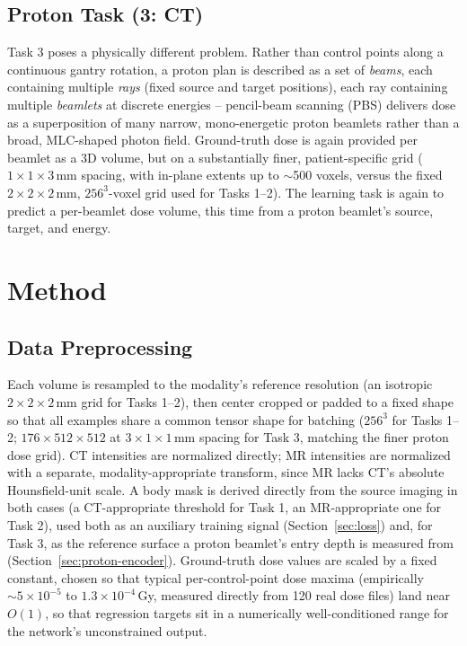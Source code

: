 \documentclass[10pt,conference]{IEEEtran}
\begin{document}
\subsection{Proton Task (3: CT)}

Task 3 poses a physically different problem. Rather than control points
along a continuous gantry rotation, a proton plan is described as a set
of \emph{beams}, each containing multiple \emph{rays} (fixed source and
target positions), each ray containing multiple \emph{beamlets} at
discrete energies -- pencil-beam scanning (PBS) delivers dose as a
superposition of many narrow, mono-energetic proton beamlets rather than
a broad, MLC-shaped photon field. Ground-truth dose is again provided
per beamlet as a 3D volume, but on a substantially finer, patient-specific
grid ($1\times1\times3$\,mm spacing, with in-plane extents up to
$\sim$500 voxels, versus the fixed $2\times2\times2$\,mm,
$256^3$-voxel grid used for Tasks 1--2). The learning task is again to
predict a per-beamlet dose volume, this time from a proton beamlet's
source, target, and energy.

\section{Method}

\subsection{Data Preprocessing}
\label{sec:preproc}

Each volume is resampled to the modality's reference resolution (an
isotropic $2\times2\times2$\,mm grid for Tasks 1--2), then center
cropped or padded to a fixed shape so that all examples share a common
tensor shape for batching ($256^3$ for Tasks 1--2; $176\times512\times512$
at $3\times1\times1$\,mm spacing for Task 3, matching the finer proton
dose grid). CT intensities are normalized directly; MR intensities are
normalized with a separate, modality-appropriate transform, since MR
lacks CT's absolute Hounsfield-unit scale. A body mask is derived
directly from the source imaging in both cases (a CT-appropriate
threshold for Task 1, an MR-appropriate one for Task 2), used both as an
auxiliary training signal (Section~\ref{sec:loss}) and, for Task 3, as
the reference surface a proton beamlet's entry depth is measured from
(Section~\ref{sec:proton-encoder}). Ground-truth dose values are scaled
by a fixed constant, chosen so that typical per-control-point dose
maxima (empirically $\sim5\times10^{-5}$ to $1.3\times10^{-4}$\,Gy,
measured directly from 120 real dose files) land near $O(1)$, so that
regression targets sit in a numerically well-conditioned range for the
network's unconstrained output.
\end{document}
